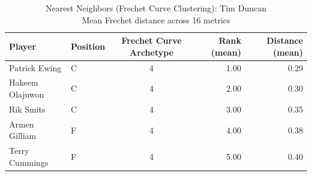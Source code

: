 \begin{table}[t]
\caption*{
{\fontsize{20}{25} Nearest Neighbors (Frechet Curve Clustering): Tim Duncan\fontsize{12}{15}\selectfont } \\ 
{\fontsize{14}{17}\selectfont  Mean Frechet distance across 16 metrics\fontsize{12}{15}\selectfont }
} 
\fontsize{12.0pt}{14.0pt}\selectfont
\begin{tabular*}{\linewidth}{@{\extracolsep{\fill}}llcrr}
\toprule
Player & Position & Frechet Curve Archetype & Rank (mean) & Distance (mean) \\ 
\midrule\addlinespace[2.5pt]
Patrick Ewing & C & 4 & 1.00 & 0.29 \\ 
Hakeem Olajuwon & C & 4 & 2.00 & 0.30 \\ 
Rik Smits & C & 4 & 3.00 & 0.35 \\ 
Armen Gilliam & F & 4 & 4.00 & 0.38 \\ 
Terry Cummings & F & 4 & 5.00 & 0.40 \\ 
\bottomrule
\end{tabular*}
\end{table}

